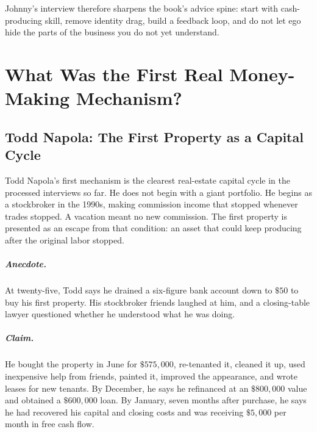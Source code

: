 \documentclass[11pt,oneside]{book}
\begin{document}
Johnny's interview therefore sharpens the book's advice spine: start with cash-producing skill, remove identity drag, build a feedback loop, and do not let ego hide the parts of the business you do not yet understand.


\chapter{What Was the First Real Money-Making Mechanism?}

\section{Todd Napola: The First Property as a Capital Cycle}

Todd Napola's first mechanism is the clearest real-estate capital cycle in the processed interviews so far. He does not begin with a giant portfolio. He begins as a stockbroker in the 1990s, making commission income that stopped whenever trades stopped. A vacation meant no new commission. The first property is presented as an escape from that condition: an asset that could keep producing after the original labor stopped.

\paragraph{Anecdote.}
At twenty-five, Todd says he drained a six-figure bank account down to \(\$50\) to buy his first property. His stockbroker friends laughed at him, and a closing-table lawyer questioned whether he understood what he was doing.

\paragraph{Claim.}
He bought the property in June for \(\$575{,}000\), re-tenanted it, cleaned it up, used inexpensive help from friends, painted it, improved the appearance, and wrote leases for new tenants. By December, he says he refinanced at an \(\$800{,}000\) value and obtained a \(\$600{,}000\) loan. By January, seven months after purchase, he says he had recovered his capital and closing costs and was receiving \(\$5{,}000\) per month in free cash flow.
\end{document}
